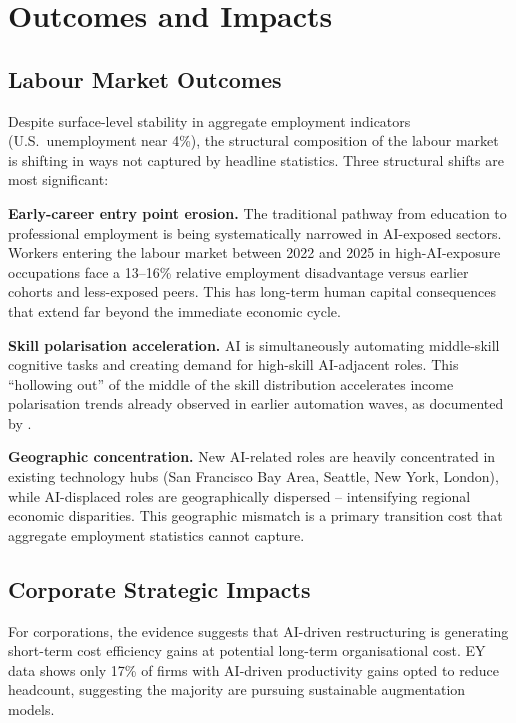 \documentclass[12pt, a4paper]{article}
\begin{document}
\section{Outcomes and Impacts}

\subsection{Labour Market Outcomes}

Despite surface-level stability in aggregate employment indicators (U.S.\ unemployment near
4\%), the structural composition of the labour market is shifting in ways not captured by
headline statistics. Three structural shifts are most significant:

\textbf{Early-career entry point erosion.} The traditional pathway from education to
professional employment is being systematically narrowed in AI-exposed sectors. Workers
entering the labour market between 2022 and 2025 in high-AI-exposure occupations face a
13--16\% relative employment disadvantage versus earlier cohorts and less-exposed peers.
This has long-term human capital consequences that extend far beyond the immediate economic
cycle.

\textbf{Skill polarisation acceleration.} AI is simultaneously automating middle-skill
cognitive tasks and creating demand for high-skill AI-adjacent roles. This ``hollowing out''
of the middle of the skill distribution accelerates income polarisation trends already
observed in earlier automation waves, as documented by \citet{acemoglu2019}.

\textbf{Geographic concentration.} New AI-related roles are heavily concentrated in existing
technology hubs (San Francisco Bay Area, Seattle, New York, London), while AI-displaced roles
are geographically dispersed -- intensifying regional economic disparities. This geographic
mismatch is a primary transition cost that aggregate employment statistics cannot capture.

\subsection{Corporate Strategic Impacts}

For corporations, the evidence suggests that AI-driven restructuring is generating short-term
cost efficiency gains at potential long-term organisational cost. EY data
\citeyearpar{ey2025} shows only 17\% of firms with AI-driven productivity gains opted to
reduce headcount, suggesting the majority are pursuing sustainable augmentation models.
\end{document}
